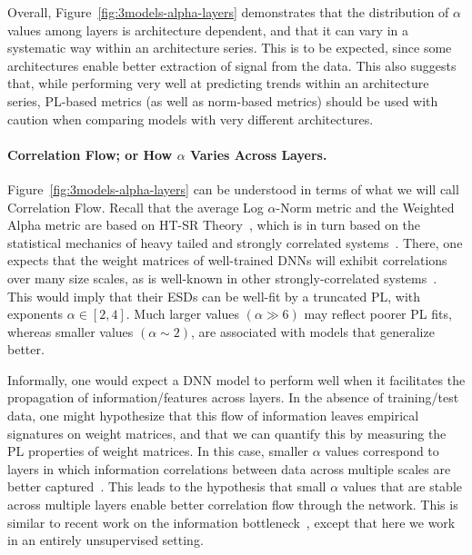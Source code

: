 Overall, Figure~\ref{fig:3models-alpha-layers} demonstrates that the distribution of $\alpha$ values among layers is architecture dependent, 
and that it can vary in a systematic way within an architecture series.
This is to be expected, since some architectures enable better extraction of signal from the data.
This also suggests that, while performing very well at predicting trends within an architecture series, PL-based metrics (as well as norm-based metrics) should be used with caution when comparing models with very different architectures.


\paragraph{Correlation Flow; or How $\alpha$ Varies Across Layers.}

Figure~\ref{fig:3models-alpha-layers} can be understood in terms of what we will call Correlation Flow.
Recall that the average Log $\alpha$-Norm metric and the Weighted Alpha metric are based on HT-SR Theory~\cite{MM18_TR, MM19_HTSR_ICML, MM20_SDM}, which is in turn based on the statistical mechanics of heavy tailed and strongly correlated systems~\cite{BouchaudPotters03, SornetteBook, BP11, bun2017}. 
There, one expects that the weight matrices of well-trained DNNs will exhibit correlations over many size scales, as is well-known in other strongly-correlated systems~\cite{BouchaudPotters03, SornetteBook}. 
This would imply that their ESDs can be well-fit by a truncated PL, with exponents $\alpha\in[2,4]$.
Much larger values $(\alpha\gg 6)$ may reflect poorer PL fits, whereas smaller values $(\alpha\sim 2)$, are associated with models that generalize better.

Informally, one would expect a DNN model to perform well when it facilitates the propagation of information/features across layers.
In the absence of training/test data, one might hypothesize that this flow of information leaves empirical signatures on weight matrices, and that we can quantify this by measuring the PL properties of weight matrices.
In this case, smaller $\alpha$ values correspond to layers in which information correlations between data across multiple scales are better captured~\cite{MM18_TR,SornetteBook}.
This leads to the hypothesis that small $\alpha$ values that are stable across multiple layers enable better correlation flow through the network.
This is similar to recent work on the information bottleneck~\cite{ST17_TR}, except that here we work in an entirely unsupervised setting.

